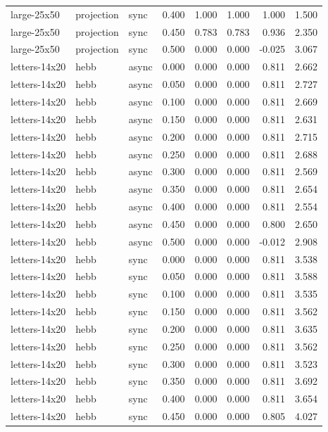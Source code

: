 \begin{tabular}{lllrrrrr}
large-25x50 & projection & sync & 0.400 & 1.000 & 1.000 & 1.000 & 1.500 \\
large-25x50 & projection & sync & 0.450 & 0.783 & 0.783 & 0.936 & 2.350 \\
large-25x50 & projection & sync & 0.500 & 0.000 & 0.000 & -0.025 & 3.067 \\
letters-14x20 & hebb & async & 0.000 & 0.000 & 0.000 & 0.811 & 2.662 \\
letters-14x20 & hebb & async & 0.050 & 0.000 & 0.000 & 0.811 & 2.727 \\
letters-14x20 & hebb & async & 0.100 & 0.000 & 0.000 & 0.811 & 2.669 \\
letters-14x20 & hebb & async & 0.150 & 0.000 & 0.000 & 0.811 & 2.631 \\
letters-14x20 & hebb & async & 0.200 & 0.000 & 0.000 & 0.811 & 2.715 \\
letters-14x20 & hebb & async & 0.250 & 0.000 & 0.000 & 0.811 & 2.688 \\
letters-14x20 & hebb & async & 0.300 & 0.000 & 0.000 & 0.811 & 2.569 \\
letters-14x20 & hebb & async & 0.350 & 0.000 & 0.000 & 0.811 & 2.654 \\
letters-14x20 & hebb & async & 0.400 & 0.000 & 0.000 & 0.811 & 2.554 \\
letters-14x20 & hebb & async & 0.450 & 0.000 & 0.000 & 0.800 & 2.650 \\
letters-14x20 & hebb & async & 0.500 & 0.000 & 0.000 & -0.012 & 2.908 \\
letters-14x20 & hebb & sync & 0.000 & 0.000 & 0.000 & 0.811 & 3.538 \\
letters-14x20 & hebb & sync & 0.050 & 0.000 & 0.000 & 0.811 & 3.588 \\
letters-14x20 & hebb & sync & 0.100 & 0.000 & 0.000 & 0.811 & 3.535 \\
letters-14x20 & hebb & sync & 0.150 & 0.000 & 0.000 & 0.811 & 3.562 \\
letters-14x20 & hebb & sync & 0.200 & 0.000 & 0.000 & 0.811 & 3.635 \\
letters-14x20 & hebb & sync & 0.250 & 0.000 & 0.000 & 0.811 & 3.562 \\
letters-14x20 & hebb & sync & 0.300 & 0.000 & 0.000 & 0.811 & 3.523 \\
letters-14x20 & hebb & sync & 0.350 & 0.000 & 0.000 & 0.811 & 3.692 \\
letters-14x20 & hebb & sync & 0.400 & 0.000 & 0.000 & 0.811 & 3.654 \\
letters-14x20 & hebb & sync & 0.450 & 0.000 & 0.000 & 0.805 & 4.027 \\

\end{tabular}
